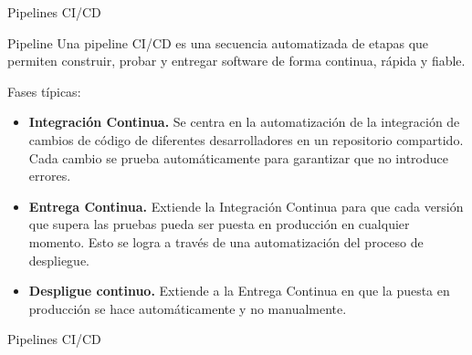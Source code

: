 \documentclass{beamer}
\begin{document}
\begin{frame}{Pipelines CI/CD}

\begin{block}{Pipeline}
    Una pipeline CI/CD es una secuencia automatizada de etapas que permiten construir, probar y entregar software de forma continua, rápida y fiable.
\end{block}

Fases típicas:

\begin{itemize}
    \item \textbf{Integración Continua.} Se centra en la automatización de la integración de cambios de código de diferentes desarrolladores en un repositorio compartido. Cada cambio se prueba automáticamente para garantizar que no introduce errores.

    \item \textbf{Entrega Continua.} Extiende la Integración Continua para que cada versión que supera las pruebas pueda ser puesta en producción en cualquier momento.
Esto se logra a través de una automatización del proceso de despliegue.

    \item \textbf{Despligue continuo.} Extiende a la Entrega Continua en que la puesta en producción se hace automáticamente y no manualmente.




\end{itemize}
    
\end{frame}

\begin{frame}{Pipelines CI/CD}

\begin{table}[h]
\centering
{}
\end{table}


    
\end{frame}
\end{document}
